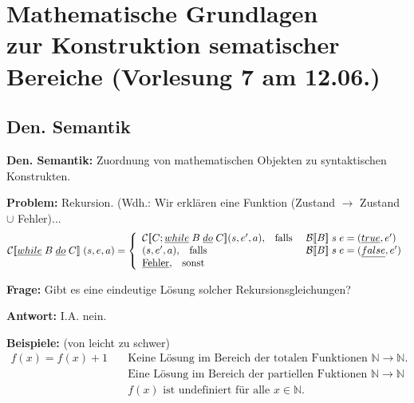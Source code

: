 \section{Mathematische Grundlagen \\ zur Konstruktion sematischer Bereiche \tiny (Vorlesung 7 am 12.06.)}
\subsection{Den. Semantik}
\begin{compactitem}
	\item[\textbf{Den. Semantik:}] Zuordnung von mathematischen Objekten zu syntaktischen Konstrukten.
	\item[\textbf{Problem:}] Rekursion. (Wdh.: Wir erklären eine Funktion (Zustand $\rightarrow$ Zustand $\cup$ Fehler)...
	\begin{align*}
			\mathcal{C}
[\![\underline{while}\;B\;\underline{do}\;C]\!]\;(s,e,a) &= \left\lbrace\begin{array}{l l} \mathcal{C}
[\![C;\underline{while}\;B\;\underline{do}\;C]\!](s,e',a)\text{,}\quad\text{falls }&\mathcal{B}
[\![B]\!]\;s\;e = (\underline{true}, e')\\
		(s,e',a)\text{,}\quad\text{falls }&\mathcal{B}
[\![B]\!]\;s\;e = (\underline{false}, e')\\
		\underline{\text{Fehler}}\text{,}\quad\text{sonst} \end{array}\right.\\
	\end{align*}
	\item[\textbf{Frage:}] Gibt es eine eindeutige Lösung solcher Rekursionsgleichungen?
	\item[\textbf{Antwort:}] I.A. nein.
	\item[\textbf{Beispiele:}] (von leicht zu schwer)
	\begin{align*}
	f(x) = f(x) + 1 &\quad\text{Keine Lösung im Bereich der totalen Funktionen } \mathbb{N}\rightarrow \mathbb{N}\text{.}\\
	&\quad\text{Eine Lösung im Bereich der partiellen Fuktionen } \mathbb{N}\rightarrow \mathbb{N}\\
	&\quad f(x)\text{ ist undefiniert für alle } x \in \mathbb{N}.\\\tag{Beispiel 1}\\
	\end{align*}
	\begin{align*}

\end{align*}
\end{compactitem}
